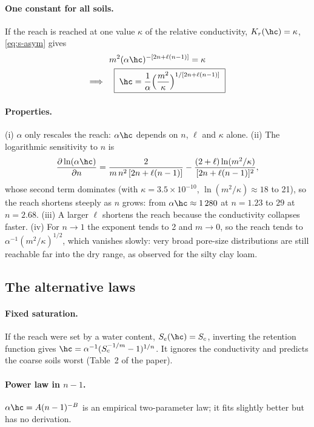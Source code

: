 \paragraph{One constant for all soils.} If the reach is reached at one value $\kappa$ of the relative conductivity, $K_r(\hc)=\kappa$, \cref{eq:s-asym} gives
\begin{equation}
\begin{gathered}m^{2}(\alpha\hc)^{-[2n+\ell(n-1)]}=\kappa\\ \Longrightarrow\quad \boxed{\;\hc=\frac{1}{\alpha}\Bigl(\frac{m^{2}}{\kappa}\Bigr)^{1/[2n+\ell(n-1)]}\;}\end{gathered} \label{eq:s-hc}
\end{equation}
\paragraph{Properties.} (i) $\alpha$ only rescales the reach: $\alpha\hc$ depends on $n$, $\ell$ and $\kappa$ alone. (ii) The logarithmic sensitivity to $n$ is
\begin{equation}
\frac{\partial\ln(\alpha\hc)}{\partial n}=\frac{2}{m\,n^{2}\,[2n+\ell(n-1)]}-\frac{(2+\ell)\ln(m^{2}/\kappa)}{[2n+\ell(n-1)]^{2}},
\end{equation}
whose second term dominates (with $\kappa=3.5\times10^{-10}$, $\ln(m^2/\kappa)\approx18$ to 21), so the reach shortens steeply as $n$ grows: from $\alpha\hc\approx1\,280$ at $n=1.23$ to $29$ at $n=2.68$. (iii) A larger $\ell$ shortens the reach because the conductivity collapses faster. (iv) For $n\to1$ the exponent tends to 2 and $m\to0$, so the reach tends to $\alpha^{-1}(m^{2}/\kappa)^{1/2}$, which vanishes slowly: very broad pore-size distributions are still reachable far into the dry range, as observed for the silty clay loam.

\subsection{The alternative laws}
\paragraph{Fixed saturation.} If the reach were set by a water content, $S_e(\hc)=S_c$, inverting the retention function gives $\hc=\alpha^{-1}(S_c^{-1/m}-1)^{1/n}$. It ignores the conductivity and predicts the coarse soils worst (Table~2 of the paper).
\paragraph{Power law in $n-1$.} $\alpha\hc=A(n-1)^{-B}$ is an empirical two-parameter law; it fits slightly better but has no derivation.
